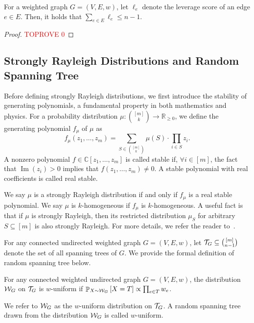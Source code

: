 \documentclass[11pt]{article}
\newcommand{\paren}[1]{\left( #1 \right)}
\newcommand{\parens}[1]{( #1 )}
\newcommand{\sqb}[1]{\left[ #1 \right]}
\newcommand{\CC}{\mathbb{C}} \newcommand{\RR}{\mathbb{R}} \renewcommand{\natural}{\mathbb{N}} \renewcommand{\Re}{\operatorname{Re}} \renewcommand{\Im}{\operatorname{Im}} \newcommand{\diag}{\operatorname{diag}} \newcommand{\supp}{\operatorname{supp}} \newcommand{\iso}{\operatorname{iso}} \newcommand{\KL}{\operatorname{KL}} \newcommand{\TV}{\operatorname{TV}} \newcommand{\mix}{\operatorname{mix}} \newcommand{\trace}{\operatorname{Tr}}
\begin{document}
{\begin{lemma}\label{le:Foster}
  For a weighted graph $G=\parens{V,E,w}$, let $\ell_{e}$ denote the leverage score of an edge $e\in E$.
  Then, it holds that $\sum_{e \in E} \ell_e \leq n - 1$.
\end{lemma}
\begin{proof}\textcolor{red}{TOPROVE 0}\end{proof}

\subsection{Strongly Rayleigh Distributions and Random Spanning Tree}
Before defining strongly Rayleigh distributions, we first introduce the stability of generating polynomials, a fundamental property in both mathematics and physics. 
For a probability distribution $\mu:\binom{\sqb{m}}{k}\to \RR_{\geq 0}$, we define the generating polynomial $f_{\mu}$ of $\mu$ as
\begin{equation*}
	f _{\mu}\parens{z_1,\ldots, z_m}= \sum_{S \in \binom{\sqb{m}}{k} }\mu\parens{S}\cdot \prod_{i \in S}z_i .
\end{equation*}
A nonzero polynomial $f\in\CC\sqb{z_1,\ldots,z_m}$ is called stable if, $\forall i \in \sqb{m}$, the fact that $\Im\parens{z_i}>0$ implies that $f \paren{z_1,\ldots,z_m}\neq 0$. A stable polynomial with real coefficients is called real stable.

We say $\mu$ is a strongly Rayleigh distribution if and only if $f_{\mu}$ is a real stable polynomial. We say $\mu$ is $k$-homogeneous if $f_{\mu}$ is $k$-homogeneous.
A useful fact is that if $\mu$ is strongly Rayleigh, then its restricted distribution $\mu _S$ 
for arbitrary $S\subseteq \sqb{m}$ is also strongly Rayleigh. For more details, we refer the reader to~\cite{borcea2009negative}.

For any connected undirected weighted graph $G=\parens{V,E,w}$, let $\cT_G \subseteq \binom{\sqb{m}}{n-1}$ denote the set of all spanning trees of $G$. We provide the formal definition of random spanning tree below.

\begin{definition}
For any connected weighted undirected graph $G =\parens{V,E,w}$, the distribution $\mathcal{W}_G$ on $\mathcal{T}_G$ is $w$-uniform if $\pb_{X\sim \cW_G}\sqb{ X=T}\propto \prod _{e \in T} w _e$.
\end{definition}
We refer to $\mathcal{W}_G$ as the $w$-uniform distribution on $\mathcal{T}_G$.
A random spanning tree drawn from the distribution $\mathcal{W}_G$ is called $w$-uniform.

}
\end{document}
